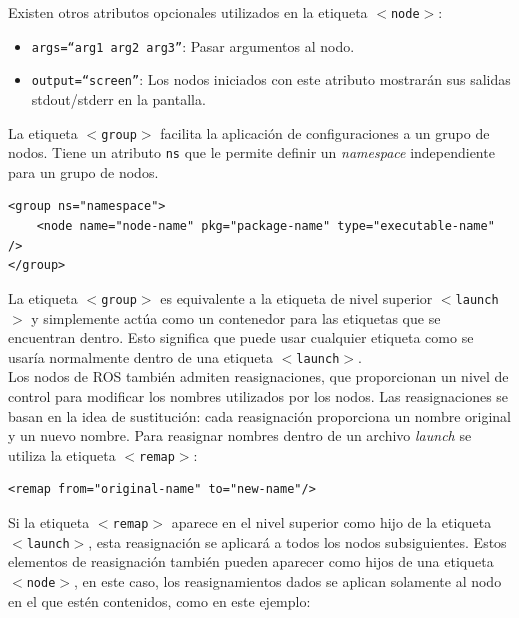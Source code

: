 \documentclass[user_manual.tex]{subfiles}
\begin{document}
Existen otros atributos opcionales utilizados en la etiqueta \texttt{$ < $node$ > $}:
\begin{itemize}
\item \texttt{args=``arg1 arg2 arg3''}: Pasar argumentos al nodo.
\item \texttt{output=``screen''}: Los nodos iniciados con este atributo mostrarán sus salidas stdout/stderr  en la pantalla.
\end{itemize}
 

La etiqueta \texttt{$ < $group$ > $} facilita la aplicación de configuraciones a un grupo de nodos. Tiene un atributo \texttt{ns} que le permite definir un \textit{namespace} independiente para un grupo de nodos.

\begin{verbatim}
<group ns="namespace">
	<node name="node-name" pkg="package-name" type="executable-name" />
</group>
\end{verbatim}

La etiqueta \texttt{$ < $group$ > $} es equivalente a la etiqueta de nivel superior \texttt{$ < $launch$ > $} y simplemente actúa como un contenedor para las etiquetas que se encuentran dentro. Esto significa que puede usar cualquier etiqueta como se usaría normalmente dentro de una etiqueta \texttt{$ < $launch$ > $}.\\

Los nodos de ROS también admiten reasignaciones, que proporcionan un nivel de control para modificar los nombres utilizados por los nodos. Las reasignaciones se basan en la idea de sustitución: cada reasignación proporciona un nombre original y un nuevo nombre. Para reasignar nombres dentro de un archivo \textit{launch} se utiliza la etiqueta \texttt{$ < $remap$ > $}:

\begin{verbatim}
<remap from="original-name" to="new-name"/>
\end{verbatim}

Si la etiqueta \texttt{$ < $remap$ > $} aparece en el nivel superior como hijo de la etiqueta \texttt{$ < $launch$ > $}, esta reasignación se aplicará a todos los nodos subsiguientes. Estos elementos de reasignación también pueden aparecer como hijos de una etiqueta \texttt{$ < $node$ > $}, en este caso, los reasignamientos dados se aplican solamente al nodo en el que estén contenidos, como en este ejemplo:
\end{document}
